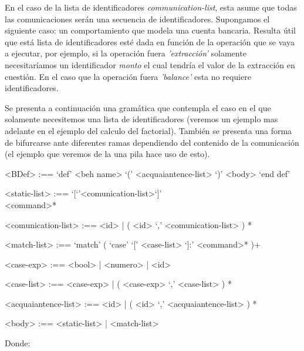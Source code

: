 En el caso de la lista de identificadores \textit{communication-list}, esta asume que todas las comunicaciones serán una secuencia de identificadores. Supongamos el siguiente caso: un comportamiento que modela una cuenta bancaria. Resulta útil que está lista de identificadores esté dada en función de la operación que se vaya a ejecutar, por ejemplo, si la operación fuera \textit{'extracción'} solamente necesitaríamos un identificador \textit{monto} el cual tendría el valor de la extracción en cuestión. En el caso que la operación fuera \textit{'balance'} esta no requiere identificadores. 

Se presenta a continuación una gramática que contempla el caso en el que solamente necesitemos una lista de identificadores (veremos un ejemplo mas adelante en el ejemplo del calculo del factorial). También se presenta una forma de bifurcarse ante diferentes ramas dependiendo del contenido de la comunicación (el ejemplo que veremos de la una pila hace uso de esto).

\begin{grammar}
<BDef> :== `def' <beh name> `(' <acquaiantence-list> `)' <body> `end def'

<static-list> :== `[`'<comunication-list>`]' \\ <command>*  

<comunication-list> :== <id> | ( <id> `,' <comunication-list> ) *

<match-list> :==  `match' ( `case' `[' <case-list> `]:' <command>* )+  

<case-exp> :== <bool> | <numero> | <id>  

<case-list> :== <case-exp> | ( <case-exp> `,' <case-list> ) *

<acquaiantence-list> :== <id> | ( <id> `,' <acquaiantence-list> ) *

<body> :== <static-list> | <match-list>

\end{grammar}

Donde: 

